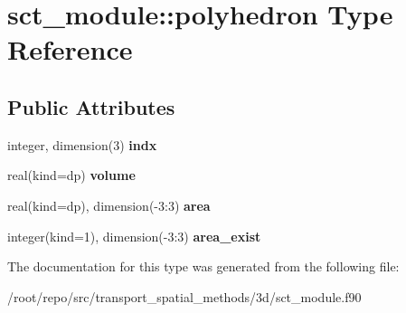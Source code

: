 \hypertarget{structsct__module_1_1polyhedron}{}\section{sct\+\_\+module\+:\+:polyhedron Type Reference}
\label{structsct__module_1_1polyhedron}
\subsection*{Public Attributes}
\begin{DoxyCompactItemize}
\item 
\mbox{\label{structsct__module_1_1polyhedron_a0a9f5f4cc18647a9ebeb2318bc83dfa7}} 
integer, dimension(3) {\bfseries indx}
\item 
\mbox{\label{structsct__module_1_1polyhedron_a20eae3d573880fd36935c35d3b1d6c75}} 
real(kind=dp) {\bfseries volume}
\item 
\mbox{\label{structsct__module_1_1polyhedron_aa39269bf2d196995f86f0b365b7c46dd}} 
real(kind=dp), dimension(-\/3\+:3) {\bfseries area}
\item 
\mbox{\label{structsct__module_1_1polyhedron_a4d8b6322e32640812e3c917645febc0b}} 
integer(kind=1), dimension(-\/3\+:3) {\bfseries area\+\_\+exist}
\end{DoxyCompactItemize}


The documentation for this type was generated from the following file\+:\begin{DoxyCompactItemize}
\item 
/root/repo/src/transport\+\_\+spatial\+\_\+methods/3d/sct\+\_\+module.\+f90\end{DoxyCompactItemize}
